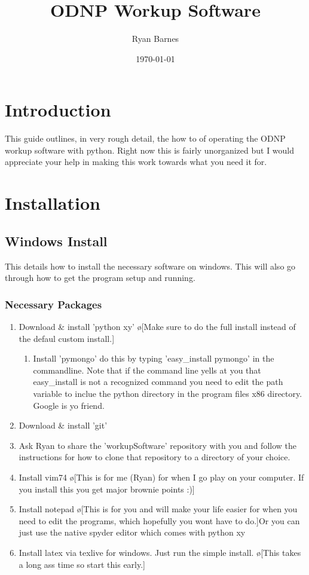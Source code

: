 \documentclass[10pt]{book}
\author{Ryan Barnes}
\title{ODNP Workup Software}
\date{\today}
\begin{document}
\maketitle
\chapter{Introduction}
This guide outlines, in very rough detail, the how to of operating the ODNP workup software with python. Right now this is fairly unorganized but I would appreciate your help in making this work towards what you need it for. 

\chapter{Installation}
\section{Windows Install}
This details how to install the necessary software on windows. This will also go through how to get the program setup and running.
\subsection{Necessary Packages}
\begin{enumerate}
    \item Download \& install 'python xy' \o[Make sure to do the full install instead of the defaul custom install.]{}
        \begin{enumerate}
            \item Install 'pymongo' do this by typing 'easy_install pymongo' in the commandline. Note that if the command line yells at you that easy_install is not a recognized command you need to edit the path variable to inclue the python directory in the program files x86 directory. Google is yo friend.
        \end{enumerate}
    \item Download \& install 'git'
    \item Ask Ryan to share the 'workupSoftware' repository with you and follow the instructions for how to clone that repository to a directory of your choice.
    \item Install vim74 \o[This is for me (Ryan) for when I go play on your computer. If you install this you get major brownie points :)]{}
    \item Install notepad \o[This is for you and will make your life easier for when you need to edit the programs, which hopefully you wont have to do.]{Or you can just use the native spyder editor which comes with python xy}
    \item Install latex via texlive for windows. Just run the simple install. \o[This takes a long ass time so start this early.]{}
\end{enumerate}
\end{document}
